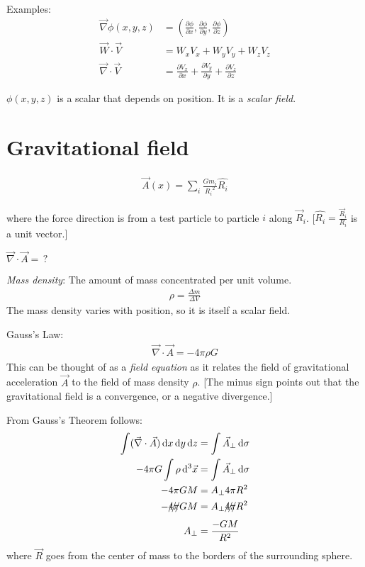 \documentclass[pagesize,headsepline,10pt,parskip=half,BCOR=12mm]{scrreprt}
\begin{document}
      Examples:
      \begin{align*}
        \vec \nabla \phi(x, y, z) &= \left(\frac{\partial
        \phi}{\partial x}, \frac{\partial \phi}{\partial y}, \frac{\partial
        \phi}{\partial z}\right)\\
        \vec W \cdot \vec V &= W_x V_x + W_y V_y + W_z V_z\\
        \vec \nabla \cdot \vec V &= \frac{\partial V_x}{\partial x}
        + \frac{\partial V_y}{\partial y} + \frac{\partial
        V_z}{\partial z}
      \end{align*}

      $\phi(x, y, z)$ is a scalar that depends on position. It is a
      \emph{scalar field}.
    \section{Gravitational field}
      \begin{align*}
        \vec A(x) = \sum_i \frac{Gm_i}{{R_i}^2} \hat{R_i}
      \end{align*}

      where the force direction is from a test particle to particle
      $i$ along $\vec R_i$. [$\hat{R_i} = \frac{\vec R_i}{R_i}$ is
      a unit vector.]

      $\vec \nabla \cdot \vec A =\, ?$

      \emph{Mass density}: The amount of mass concentrated per unit
      volume.
      \begin{align}
        \rho = \frac{\Delta m}{\Delta V}
      \end{align}
      The mass density varies with position, so it is itself
      a scalar field.

      Gauss's Law:
      \begin{align}
        \vec \nabla \cdot \vec A = -4 \pi \rho G
      \end{align}
      This can be thought of as a \emph{field equation} as it
      relates the field of gravitational acceleration $\vec A$ to
      the field of mass density $\rho$. [The minus sign points out
      that the gravitational field is a convergence, or a negative
      divergence.]

      From Gauss's Theorem follows:
      \begin{align}
        \int (\vec \nabla \cdot \vec A)\,\mathrm{d}x\,\mathrm{d}y\,\mathrm{d}z &= \int
        \vec A_\perp\,\mathrm{d}\sigma\\
        -4 \pi G \int \rho\,\mathrm{d}^3\vec x &= \int \vec
        A_\perp\,\mathrm{d}\sigma\\
        -4 \pi G M &= A_\perp 4 \pi R^2\\
        -\xout{4 \pi} G M &= A_\perp \xout{4 \pi} R^2\\
        A_\perp &= \frac{-G M}{R^2}
      \end{align}
      where $\vec R$ goes from the center of mass to the
      borders of the surrounding sphere.
\end{document}
